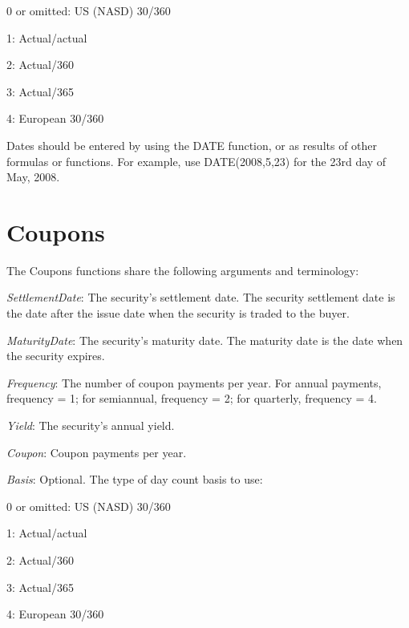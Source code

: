 0 or omitted: US (NASD) 30/360 

1: Actual/actual 

2: Actual/360 

3: Actual/365 

4: European 30/360 

\vspace{0.3cm}
Dates should be entered by using the DATE function, or as results of other formulas or functions. For example, use DATE(2008,5,23) for the 23rd day of May, 2008. 















\newpage
\section{Coupons}
The Coupons functions share the following arguments and terminology:

\vspace{0.3cm}
\textit{SettlementDate}: The security's settlement date. The security settlement date is the date after the issue date when the security is traded to the buyer.

\vspace{0.3cm}
\textit{MaturityDate}: The security's maturity date. The maturity date is the date when the security expires.

\vspace{0.3cm}
\textit{Frequency}: The number of coupon payments per year. For annual payments, frequency = 1; for semiannual, frequency = 2; for quarterly, frequency = 4.

\vspace{0.3cm}
\textit{Yield}: The security's annual yield.

\vspace{0.3cm}
\textit{Coupon}: Coupon payments per year.


\vspace{0.3cm}
\textit{Basis}:  Optional. The type of day count basis to use:

0 or omitted: US (NASD) 30/360 

1: Actual/actual 

2: Actual/360 

3: Actual/365 

4: European 30/360 

